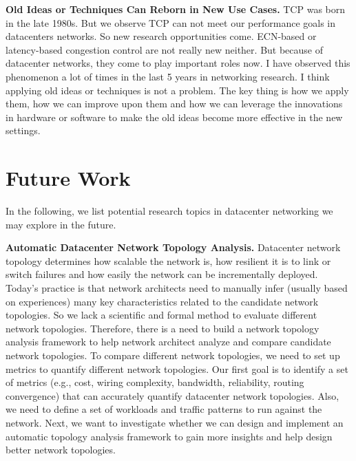 \iffalse
{\bf Thinking Twice Before Starting a New Project.}
Choosing a project is as important as finishing it. Finding a promising project is not always easy. 
The lesson I learned is that we should think twice before starting a new project and once we start it, we  should 
try our best. An example is the AC/DC TCP project. 
Actually, at that time, we had a few topics we might want to explore. 
I spent around one month to think which topic was more promising. I actually built a sketch in my head and 
thought what were the major steps and major challenges in a each project. 
This helps reduce the risk of starting an ambitious project.
\fi

{\bf Old Ideas or Techniques Can Reborn in New Use Cases.}
TCP was born in the late 1980s. But we observe TCP can not meet our performance goals in datacenters networks. 
So new research opportunities come. ECN-based or latency-based congestion control are not really new neither. 
But because of datacenter networks, they come to play important roles now. 
I have observed this phenomenon a lot of times in the last 5 years in networking research. 
I think applying old ideas or techniques is not a problem. The key thing is how we 
apply them, how we can improve upon them and how we can leverage the 
innovations in hardware or software to make the old 
ideas become more effective in the new settings. 

\section{Future Work}
In the following, we list potential research topics in datacenter networking we may explore in the future.

{\bf Automatic Datacenter Network Topology Analysis.}
Datacenter network topology determines how scalable the network is,
how resilient it is to link or switch failures and how easily the network
can be incrementally deployed. Today's practice is that network architects need to
manually infer (usually based on experiences) many key characteristics related to
the candidate network topologies. So we lack a scientific and formal method to
evaluate different network topologies. Therefore, there is a need to build a network
topology analysis framework to help network architect analyze and compare
candidate network topologies. To compare different network topologies, we need to
set up metrics to quantify different network topologies. Our first goal is to
identify a set of metrics (e.g., cost, wiring complexity, bandwidth, reliability, routing convergence) that
can accurately quantify datacenter network topologies.  Also, we need to define a set of workloads
and traffic patterns to run against the network. 
Next, we want to investigate whether we can design and implement
an automatic topology analysis framework to gain more insights and help design better network topologies.

